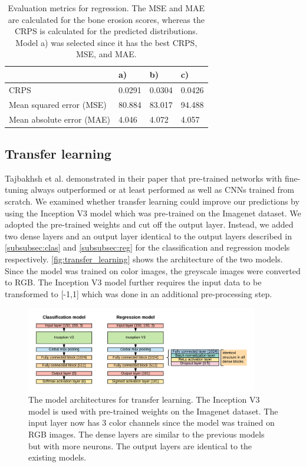 \documentclass[12pt]{article}
\begin{document}
\begin{table}[ht]
\centering
\caption{Evaluation metrics for regression. The MSE and MAE are calculated for the bone erosion scores, whereas the CRPS is calculated for the predicted distributions. Model a) was selected since it has the best CRPS, MSE, and MAE.}
\label{tab:metrics_reg}
\begin{tabular}{@{}llll@{}}
\toprule
                                & a)    & b)    & c)    \\ \midrule
CRPS							& 0.0291 & 0.0304 & 0.0426 \\
Mean squared error (MSE)        & 80.884 & 83.017 & 94.488 \\
Mean absolute error (MAE)       & 4.046 & 4.072 & 4.057 \\

\bottomrule
\end{tabular}
\end{table}

\FloatBarrier

\subsection{Transfer learning}
\label{subsec:transfer_learning}

Tajbakhsh et al. \cite{tajbakhsh_2017} demonstrated in their paper that pre-trained networks with fine-tuning always outperformed or at least performed as well as CNNs trained from scratch. We examined whether transfer learning could improve our predictions by using the Inception V3 model \cite{szegedy_2015} which was pre-trained on the Imagenet dataset. We adopted the pre-trained weights and cut off the output layer. Instead, we added two dense layers and an output layer identical to the output layers described in \autoref{subsubsec:clas} and \autoref{subsubsec:reg} for the classification and regression models respectively. \autoref{fig:transfer_learning} shows the architecture of the two models. Since the model was trained on color images, the greyscale images were converted to RGB. The Inception V3 model further requires the input data to be transformed to [-1,1] which was done in an additional pre-processing step.

\begin{figure}[ht]
\includegraphics[width=4in]{transfer_learning}	
\caption{The model architectures for transfer learning. The Inception V3 model is used with pre-trained weights on the Imagenet dataset. The input layer now has 3 color channels since the model was trained on RGB images. The dense layers are similar to the previous models but with more neurons. The output layers are identical to the existing models.}
\label{fig:transfer_learning}
\end{figure}
\end{document}
